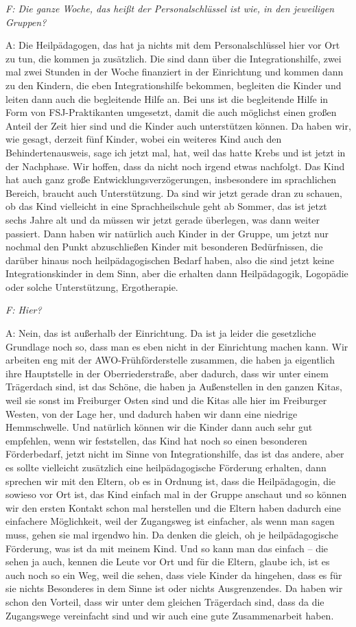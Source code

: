 \emph{F: Die ganze Woche, das heißt der Personalschlüssel ist wie, in den jeweiligen Gruppen?} 

A: Die Heilpädagogen, das hat ja nichts mit dem Personalschlüssel hier vor Ort zu tun, die kommen ja zusätzlich. Die sind dann über die Integrationshilfe, zwei mal zwei Stunden in der Woche finanziert in der Einrichtung und kommen dann zu den Kindern, die eben Integrationshilfe bekommen, begleiten die Kinder und leiten dann auch die begleitende Hilfe an. Bei uns ist die begleitende Hilfe in Form von FSJ-Praktikanten umgesetzt, damit die auch möglichst einen großen Anteil der Zeit hier sind und die Kinder auch unterstützen können. Da haben wir, wie gesagt, derzeit fünf Kinder, wobei ein weiteres Kind auch den Behindertenausweis, sage ich jetzt mal, hat, weil das hatte Krebs und ist jetzt in der Nachphase. Wir hoffen, dass da nicht noch irgend etwas nachfolgt. Das Kind hat auch ganz große Entwicklungsverzögerungen, insbesondere im sprachlichen Bereich, braucht auch Unterstützung. Da sind wir jetzt gerade dran zu schauen, ob das Kind vielleicht in eine Sprachheilschule geht ab Sommer, das ist jetzt sechs Jahre alt und da müssen wir jetzt gerade überlegen, was dann weiter passiert. Dann haben wir natürlich auch Kinder in der Gruppe, um jetzt nur nochmal den Punkt abzuschließen Kinder mit besonderen Bedürfnissen, die darüber hinaus noch heilpädagogischen Bedarf haben, also die sind jetzt keine Integrationskinder in dem Sinn, aber die erhalten dann Heilpädagogik, Logopädie oder solche Unterstützung, Ergotherapie.

\emph{F: Hier?} 

A: Nein, das ist außerhalb der Einrichtung. Da ist ja leider die gesetzliche Grundlage noch so, dass man es eben nicht in der Einrichtung machen kann. Wir arbeiten eng mit der AWO-Frühförderstelle zusammen, die haben ja eigentlich ihre Hauptstelle in der Oberriederstraße, aber dadurch, dass wir unter einem Trägerdach sind, ist das Schöne, die haben ja Außenstellen in den ganzen Kitas, weil sie sonst im Freiburger Osten sind und die Kitas alle hier im Freiburger Westen, von der Lage her, und dadurch haben wir dann eine niedrige Hemmschwelle. Und natürlich können wir die Kinder dann auch sehr gut empfehlen, wenn wir feststellen, das Kind hat noch so einen besonderen Förderbedarf, jetzt nicht im Sinne von Integrationshilfe, das ist das andere, aber es sollte vielleicht zusätzlich eine heilpädagogische Förderung erhalten, dann sprechen wir mit den Eltern, ob es in Ordnung ist, dass die Heilpädagogin, die sowieso vor Ort ist, das Kind einfach mal in der Gruppe anschaut und so können wir den ersten Kontakt schon mal herstellen und die Eltern haben dadurch eine einfachere Möglichkeit, weil der Zugangsweg ist einfacher, als wenn man sagen muss, gehen sie mal irgendwo hin. Da denken die gleich, oh je heilpädagogische Förderung, was ist da mit meinem Kind. Und so kann man das einfach -- die sehen ja auch, kennen die Leute vor Ort und für die Eltern, glaube ich, ist es auch noch so ein Weg, weil die sehen, dass viele Kinder da hingehen, dass es für sie nichts Besonderes in dem Sinne ist oder nichts Ausgrenzendes. Da haben wir schon den Vorteil, dass wir unter dem gleichen Trägerdach sind, dass da die Zugangswege vereinfacht sind und wir auch eine gute Zusammenarbeit haben.

